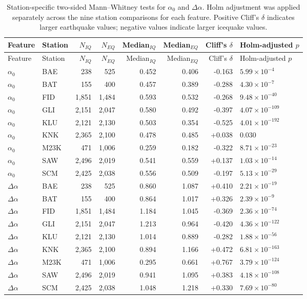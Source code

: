 \begin{longtable}{llrrrrrl}
\caption{Station-specific two-sided Mann--Whitney tests for $\alpha_0$ and $\Delta\alpha$. Holm adjustment was applied separately across the nine station comparisons for each feature. Positive Cliff's $\delta$ indicates larger earthquake values; negative values indicate larger icequake values.}\label{tab:supp_tests}\\
\toprule
Feature & Station & $N_{IQ}$ & $N_{EQ}$ & Median$_{IQ}$ & Median$_{EQ}$ & Cliff's $\delta$ & Holm-adjusted $p$ \\
\midrule
\endfirsthead
\toprule
Feature & Station & $N_{IQ}$ & $N_{EQ}$ & Median$_{IQ}$ & Median$_{EQ}$ & Cliff's $\delta$ & Holm-adjusted $p$ \\
\midrule
\endhead
$\alpha_0$ & BAE & 238 & 525 & 0.452 & 0.406 & -0.163 & $5.99\times10^{-4}$ \\
$\alpha_0$ & BAT & 155 & 400 & 0.457 & 0.389 & -0.288 & $4.30\times10^{-7}$ \\
$\alpha_0$ & FID & 1,851 & 1,484 & 0.593 & 0.532 & -0.268 & $9.48\times10^{-40}$ \\
$\alpha_0$ & GLI & 2,151 & 2,047 & 0.580 & 0.492 & -0.397 & $4.07\times10^{-109}$ \\
$\alpha_0$ & KLU & 2,121 & 2,130 & 0.503 & 0.354 & -0.525 & $4.01\times10^{-192}$ \\
$\alpha_0$ & KNK & 2,365 & 2,100 & 0.478 & 0.485 & +0.038 & 0.030 \\
$\alpha_0$ & M23K & 471 & 1,006 & 0.259 & 0.182 & -0.322 & $8.71\times10^{-23}$ \\
$\alpha_0$ & SAW & 2,496 & 2,019 & 0.541 & 0.559 & +0.137 & $1.03\times10^{-14}$ \\
$\alpha_0$ & SCM & 2,425 & 2,038 & 0.556 & 0.509 & -0.197 & $5.13\times10^{-29}$ \\
$\Delta\alpha$ & BAE & 238 & 525 & 0.860 & 1.087 & +0.410 & $2.21\times10^{-19}$ \\
$\Delta\alpha$ & BAT & 155 & 400 & 0.864 & 1.017 & +0.326 & $2.39\times10^{-9}$ \\
$\Delta\alpha$ & FID & 1,851 & 1,484 & 1.184 & 1.045 & -0.369 & $2.36\times10^{-74}$ \\
$\Delta\alpha$ & GLI & 2,151 & 2,047 & 1.213 & 0.964 & -0.420 & $4.36\times10^{-122}$ \\
$\Delta\alpha$ & KLU & 2,121 & 2,130 & 1.014 & 0.889 & -0.282 & $1.88\times10^{-56}$ \\
$\Delta\alpha$ & KNK & 2,365 & 2,100 & 0.894 & 1.166 & +0.472 & $6.81\times10^{-163}$ \\
$\Delta\alpha$ & M23K & 471 & 1,006 & 0.295 & 0.661 & +0.767 & $3.79\times10^{-124}$ \\
$\Delta\alpha$ & SAW & 2,496 & 2,019 & 0.941 & 1.095 & +0.383 & $4.18\times10^{-108}$ \\
$\Delta\alpha$ & SCM & 2,425 & 2,038 & 1.048 & 1.218 & +0.330 & $7.69\times10^{-80}$ \\
\bottomrule
\end{longtable}

